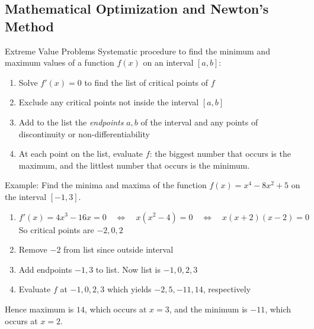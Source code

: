 
\subsection{Mathematical Optimization and Newton's Method}

\begin{frame}{Extreme Value Problems}
    Systematic procedure to find the minimum and maximum values of a
    function $f(x)$ on an interval $[a,b]$:

    \begin{enumerate}
        \item Solve $f'(x)=0$ to find the list of critical points of $f$
        \item Exclude any critical points not inside the interval $[a,b]$
        \item Add to the list the {\it endpoints} $a,b$ of the interval and
              any points of discontinuity or non-differentiability
        \item At each point on the list, evaluate $f$: the
              biggest number that occurs is the maximum, and the littlest number
              that occurs is the minimum.
    \end{enumerate}
    \vspace*{5mm}

    Example: Find the minima and maxima of the
    function $f(x)=x^4-8x^2+5$ on the interval $[-1,3]$. \\
    \begin{enumerate}
        \item $f'(x) = 4 x^3-16x = 0 \quad \Longleftrightarrow \quad x(x^2 - 4) = 0 \quad \Longleftrightarrow \quad x(x + 2)(x - 2)=0$\\
              So critical points are $-2,0,2$
        \item Remove $-2$ from list since outside interval
        \item Add endpoints $-1,3$ to list. Now list is $-1,0,2,3$
        \item Evaluate $f$ at $-1,0,2,3$ which yields $-2, 5, -11, 14$, respectively
    \end{enumerate}
    Hence maximum is $14$, which occurs at $x=3$, and the minimum is $-11$,
    which occurs at $x=2$.
\end{frame}


